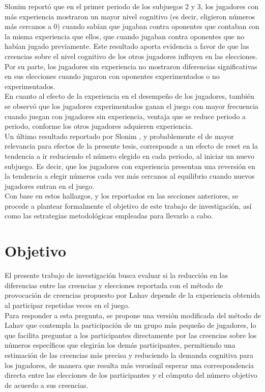 Slonim \parencite*{Slonim2005} reportó que en el primer periodo de los subjuegos 2 y 3, los jugadores con más experiencia mostraron un mayor nivel cognitivo (es decir, eligieron números más cercanos a 0) cuando sabían que jugaban contra oponentes que contaban con la misma experiencia que ellos, que cuando jugaban contra oponentes que no habían jugado previamente. Este resultado aporta evidencia a favor de que las creencias sobre el nivel cognitivo de los otros jugadores influyen en las elecciones. Por su parte, los jugadores sin experiencia no mostraron diferencias signiﬁcativas en sus elecciones cuando jugaron con oponentes experimentados o no experimentados.\\

En cuanto al efecto de la experiencia en el desempeño de los jugadores, también se observó que los jugadores experimentados ganan el juego con mayor frecuencia cuando juegan con jugadores sin experiencia, ventaja que se reduce periodo a periodo, conforme los otros jugadores adquieren experiencia.\\

Un último resultado reportado por Slonim \parencite*{Slonim2005}, y probablemente el de mayor relevancia para efectos de la presente tesis, corresponde a un efecto de reset en la tendencia a ir reduciendo el número elegido en cada periodo, al iniciar un nuevo subjuego. Es decir, que los jugadores con experiencia presentan una reversión en la tendencia a elegir números cada vez más cercanos al equilibrio cuando nuevos jugadores entran en el juego.\\

Con base en estos hallazgos, y los reportados en las secciones anteriores, se procede a plantear formalmente el objetivo de este trabajo de investigación, así como las estrategias metodológicas empleadas para llevarlo a cabo. \\

\section{Objetivo}

El presente trabajo de investigación busca evaluar si la reducción en las diferencias entre las creencias y elecciones reportada con el método de provocación de creencias propuesto por Lahav \parencite*{Lahav2015} depende de la experiencia obtenida al participar repetidas veces en el juego.\\

Para responder a esta pregunta, se propone una versión modificada del método de Lahav \parencite*{Lahav2015} que contempla la participación de un grupo más pequeño de jugadores, lo que facilita preguntar a los participantes directamente por las creencias sobre los números específicos que elegirán los demás participantes, permitiendo una estimación de las creencias más precisa y reduciendo la demanda cognitiva para los jugadores, de manera que resulta más verosímil esperar una correspondencia directa entre las elecciones de los participantes y el cómputo del número objetivo de acuerdo a sus creencias.\\

